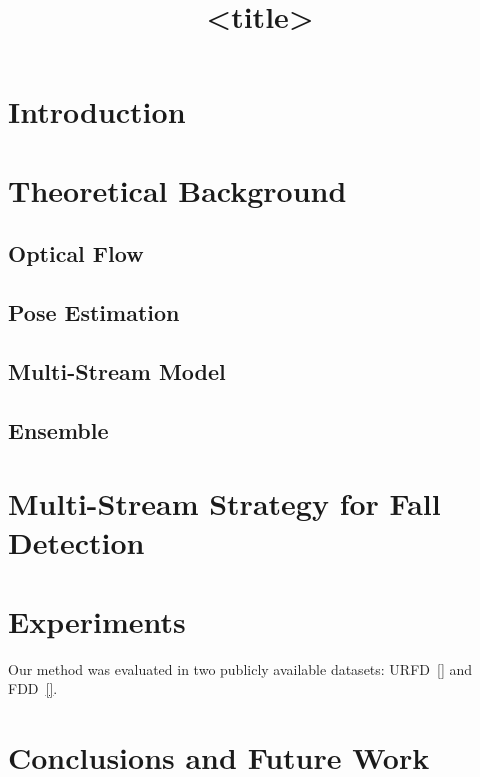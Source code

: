 \documentclass{article}
\title{<title>}
\begin{document}
\ninept
%
\maketitle
%
\begin{abstract}
\end{abstract}
%
\begin{keywords}
\end{keywords}
%
\section{Introduction}
\label{sec:intro}

\section{Theoretical Background}
\label{sec:back}

\subsection{Optical Flow}
\label{ssec:featSelection}

\subsection{Pose Estimation}
\label{ssec:featSelection}

\subsection{Multi-Stream Model}
\label{ssec:MModel}

\subsection{Ensemble}
\label{ssec:esb}

\section{Multi-Stream Strategy for Fall Detection}
\label{sec:model}

\section{Experiments}
\label{sec:experiments}

Our method was evaluated in two publicly available datasets: URFD~\ref{} and FDD~\ref{}. 

\section{Conclusions and Future Work}
\label{sec:conclusion}



\end{document}

